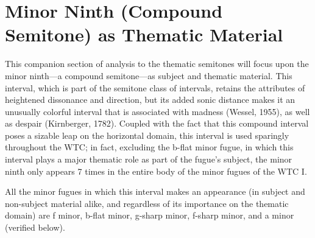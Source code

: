     \section{Minor Ninth (Compound Semitone) as Thematic
Material}\label{minor-ninth-compound-semitone-as-thematic-material}

This companion section of analysis to the thematic semitones will focus
upon the minor ninth---a compound semitone---as subject and
thematic material. This interval, which is part of the semitone class of
intervals, retains the attributes of heightened dissonance and
direction, but its added sonic distance makes it an unusually colorful
interval that is associated with madness (Wessel, 1955), as well as
despair (Kirnberger, 1782). Coupled with the fact that this compound
interval poses a sizable leap on the horizontal domain, this interval is
used sparingly throughout the WTC; in fact, excluding the b-flat minor
fugue, in which this interval plays a major thematic role as part of the
fugue's subject, the minor ninth only appears 7 times in the entire body
of the minor fugues of the WTC I.

All the minor fugues in which this interval makes an appearance (in
subject and non-subject material alike, and regardless of its importance
on the thematic domain) are f minor, b-flat minor, g-sharp minor,
f-sharp minor, and a minor (verified below).

